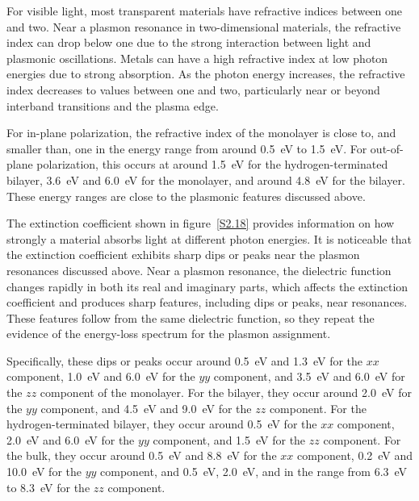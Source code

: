 For visible light, most transparent materials have refractive indices between one and two.
Near a plasmon resonance in two-dimensional materials,
the refractive index can drop below one due to the strong interaction between light and plasmonic oscillations.
Metals can have a high refractive index at low photon energies due to strong absorption.
As the photon energy increases, the refractive index decreases to values between one and two,
particularly near or beyond interband transitions and the plasma edge.

For in-plane polarization, the refractive index of the monolayer is close to,
and smaller than, one in the energy range from around \qty{0.5}{\electronvolt} to \qty{1.5}{\electronvolt}.
For out-of-plane polarization, this occurs at around \qty{1.5}{\electronvolt} for the hydrogen-terminated bilayer,
\qty{3.6}{\electronvolt} and \qty{6.0}{\electronvolt} for the monolayer,
and around \qty{4.8}{\electronvolt} for the bilayer.
These energy ranges are close to the plasmonic features discussed above.

The extinction coefficient shown in figure~\ref{S2.18} provides information on how strongly a material absorbs light at different photon energies.
It is noticeable that the extinction coefficient exhibits sharp dips or peaks near the plasmon resonances discussed above.
Near a plasmon resonance,
the dielectric function changes rapidly in both its real and imaginary parts,
which affects the extinction coefficient and produces sharp features,
including dips or peaks, near resonances.
These features follow from the same dielectric function, so they repeat the evidence of the energy-loss spectrum for the plasmon assignment.

Specifically, these dips or peaks occur around \qty{0.5}{\electronvolt} and \qty{1.3}{\electronvolt} for the $xx$ component,
\qty{1.0}{\electronvolt} and \qty{6.0}{\electronvolt} for the $yy$ component,
and \qty{3.5}{\electronvolt} and \qty{6.0}{\electronvolt} for the $zz$ component of the monolayer.
For the bilayer, they occur around \qty{2.0}{\electronvolt} for the $yy$ component,
and \qty{4.5}{\electronvolt} and \qty{9.0}{\electronvolt} for the $zz$ component.
For the hydrogen-terminated bilayer, they occur around \qty{0.5}{\electronvolt} for the $xx$ component,
\qty{2.0}{\electronvolt} and \qty{6.0}{\electronvolt} for the $yy$ component,
and \qty{1.5}{\electronvolt} for the $zz$ component.
For the bulk, they occur around \qty{0.5}{\electronvolt} and \qty{8.8}{\electronvolt} for the $xx$ component,
\qty{0.2}{\electronvolt} and \qty{10.0}{\electronvolt} for the $yy$ component,
and \qty{0.5}{\electronvolt}, \qty{2.0}{\electronvolt},
and in the range from \qty{6.3}{\electronvolt} to \qty{8.3}{\electronvolt} for the $zz$ component.

